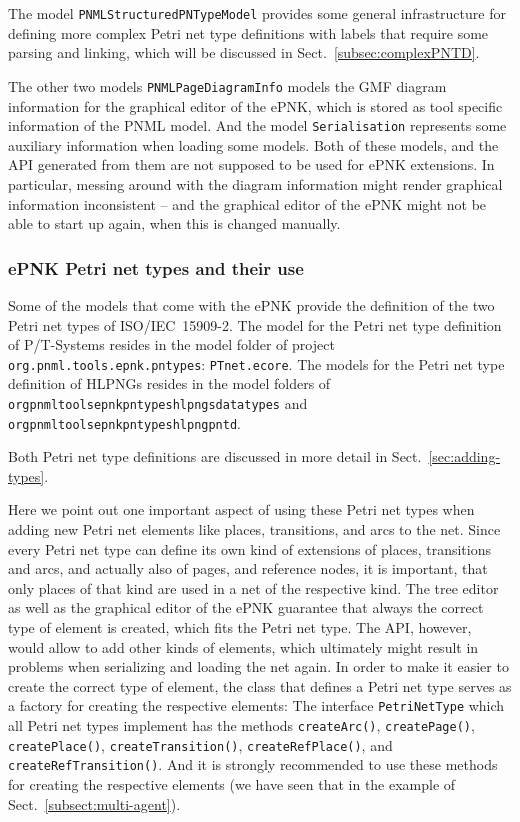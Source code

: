 The model {\tt PNMLStructuredPNTypeModel} provides some general infrastructure
for defining more complex Petri net type definitions with labels that require
some parsing and linking, which will be discussed in Sect.~\ref{subsec:complexPNTD}.

The other two models {\tt PNMLPageDiagramInfo} models the GMF diagram information
for the graphical editor of the ePNK, which is stored as tool specific
information of the PNML model. And the model {\tt Serialisation} represents some auxiliary
information when loading some models. Both of these models, and the API
generated from them are not supposed to be used for ePNK extensions. In particular,
messing around with the diagram information might render graphical information
inconsistent -- and the graphical editor of the ePNK might not be able to start
up again, when this is changed manually. 

\subsubsection{ePNK Petri net types and their use}
\label{subsubsec:function:PNTD:use}

Some of the models that come with the ePNK provide the definition of the
two Petri net types of ISO/IEC~15909-2. The model for the Petri net type
definition of P/T-Systems resides in the model folder of
project {\tt org.pnml.tools.epnk.pntypes}: {\tt PTnet.ecore}.
The models for the Petri net type definition of HLPNGs resides in the
model folders of
{\tt org\qnsep{}pnml\qnsep{}tools\qnsep{}epnk\qnsep{}pntypes\qnsep{}hlpngs\qnsep{}datatypes} 
and {\tt org\qnsep{}pnml\qnsep{}tools\qnsep{}epnk\qnsep{}pntypes\qnsep{}hlpng\qnsep{}pntd}.

Both Petri net type definitions are discussed in more detail
in Sect.~\ref{sec:adding-types}.

Here we point out one important aspect of using these Petri net types
when adding new Petri net elements like places, transitions, and arcs
to the net. Since every Petri net type can define its own kind of
extensions of places, transitions and arcs, and actually also of
pages, and reference nodes, it is important, that only places of
that kind are used in a net of the respective kind. The tree editor as
well as the graphical editor of the ePNK guarantee that always the
correct type of element is created, which fits the Petri net type.
The API, however, would allow to add other kinds of elements,
which ultimately might result in problems when serializing and
loading the net again. In order to make it easier to create the
correct type of element, the class that defines a Petri net type
serves as a factory for creating the respective elements: The
interface {\tt PetriNetType} which all Petri net types implement
has the methods {\tt createArc()},  {\tt createPage()},  {\tt createPlace()},
 {\tt createTransition()},  {\tt createRefPlace()}, and  {\tt createRefTransition()}.
And it is strongly recommended to use these methods for creating
the respective elements (we have seen that in the example of
Sect.~\ref{subsect:multi-agent}).

